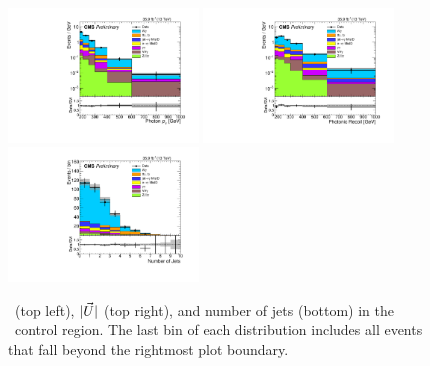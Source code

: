 \begin{figure}[htbp]
  \begin{center}
    \includegraphics[width=0.45\textwidth]{Figures/results/weng_phoPt.pdf}
    \includegraphics[width=0.45\textwidth]{Figures/results/weng_recoil.pdf}
    \includegraphics[width=0.45\textwidth]{Figures/results/weng_nJet.pdf}
    \caption{
      \ETgamma\ (top left), $|\vec{U}|$ (top right), and number of jets (bottom) in the \Pe\Pgamma\ control region.
      The last bin of each distribution includes all events that fall beyond the rightmost plot boundary.
    }
    \label{fig:monoel}
  \end{center}
\end{figure}

